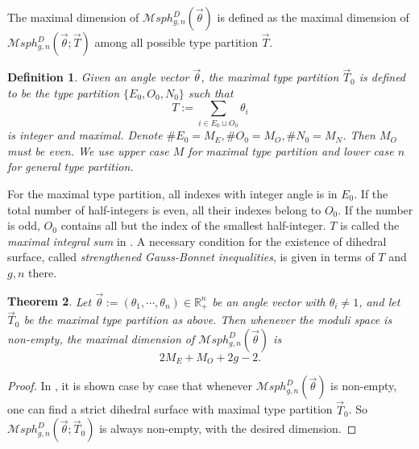 \documentclass[pdflatex,sn-mathphys]{sn-jnl}%
\numberwithin{equation}{section}
\theoremstyle{thmstyleone}%
\newtheorem{theorem}{Theorem}[section]%
\newtheorem{definition}[theorem]{Definition}
\newcommand{\RR}{\mathbb{R}}
\newcommand{\MsphDT}[4]{\mathcal{M}sph_{#1,#2}^D(#3;#4)}
\newcommand{\MsphgnD}{\mathcal{M}sph^D_{g,n}(\vec{\theta})}
\newcommand{\MsphgnDT}{\mathcal{M}sph_{g,n}^D(\vec{\theta};\vec{T})}
\newcommand{\DEF}{\emph}
\begin{document}
The maximal dimension of $\MsphgnD$ is defined as the maximal dimension of $\MsphgnDT$ among all possible type partition $\vec{T}$.

\begin{definition}
    Given an angle vector $\vec{\theta}$, the \DEF{maximal type partition} $\vec{T}_0$ is defined to be the type partition $\{E_0,O_0,N_0\}$ such that
    \[ T := \sum_{i\in E_0\sqcup O_0} \theta_i \] 
    is integer and maximal.
    Denote $\#E_0= M_E ,\#O_0=M_O, \#N_0=M_N$. Then $M_O$ must be even. We use upper case $M$ for maximal type partition and lower case $n$ for general type partition.
\end{definition}
For the maximal type partition, all indexes with integer angle is in $E_0$. If the total number of half-integers is even, all their indexes belong to $O_0$. If the number is odd, $O_0$ contains all but the index of the smallest half-integer.
$T$ is called the \DEF{maximal integral sum} in \cite{GT23}. A necessary condition for the existence of dihedral surface, called \DEF{strengthened Gauss-Bonnet inequalities}, is given in terms of $T$ and $g,n$ there.


\begin{theorem}\label{thm:dim_count_D}
    Let $\vec{\theta}:=(\theta_1, \cdots, \theta_n) \in \RR^n_+$ be an angle vector with $\theta_i\neq1$, and let $\vec{T}_0$ be the maximal type partition as above. %
    Then whenever the moduli space is non-empty, the maximal dimension of $\MsphgnD$ is
    \[ 2M_E+M_O+2g-2. \]
\end{theorem}

\begin{proof}
    In \cite[Section 5.1, Section 6.2]{GT23}, it is shown case by case that whenever $\MsphgnD$ is non-empty, one can find a strict dihedral surface with maximal type partition $\vec{T}_0$.
    So $\MsphDT{g}{n}{\vec{\theta}}{\vec{T}_0}$ is always non-empty, with the desired dimension.
\end{proof}
\end{document}
